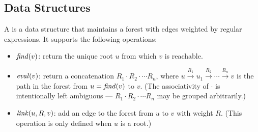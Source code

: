 \subsection{Data Structures}


A  is a data structure that
maintains a forest with edges weighted by regular expressions. It
supports the following operations:

\begin{itemize}
\item $\mathit{find}(v)$: return the unique root $u$ from which $v$ is
  reachable.
\item $\eval{v}$: return a concatenation
  $R_1 \cdot R_2 \cdot \cdots R_n$, where
  $u \xrightarrow{R_1} u_1 \xrightarrow{R_2} \cdots
  \xrightarrow{R_n} v$ is the path in the forest from
  $u = \mathit{find}(v)$ to $v$. (The associativity of $\cdot$ is
  intentionally left ambiguous ---
  $R_1 \cdot R_2 \cdot \cdots R_n$ may be grouped arbitrarily.)
\item $\mathit{link}(u, R, v)$: add an edge to the forest from $u$ to $v$
  with weight $R$. (This operation is only defined when $u$ is a
  root.)
\end{itemize}
